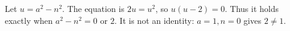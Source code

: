 Let $ u=a^2-n^2 $. The equation is $ 2u=u^2 $, so $ u(u-2)=0 $. Thus it holds exactly when $\boxed{a^2-n^2=0\text{ or }2}$. It is not an identity: $ a=1,n=0 $ gives $ 2\ne1 $.
